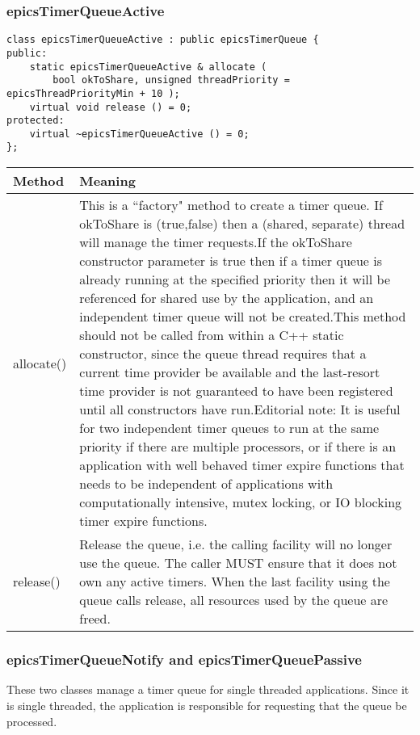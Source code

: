 \subsubsection{epicsTimerQueueActive}

\begin{verbatim}class epicsTimerQueueActive : public epicsTimerQueue {
public:
    static epicsTimerQueueActive & allocate (
        bool okToShare, unsigned threadPriority = epicsThreadPriorityMin + 10 );
    virtual void release () = 0;
protected:
    virtual ~epicsTimerQueueActive () = 0;
};
\end{verbatim}
\begin{center}\begin{longtable}{p{1.1in}p{5.0in}}
\textbf{Method} & \textbf{Meaning}\\
\hline
allocate() & This is a ``factory" method to create a timer queue. If okToShare is (true,false) then a (shared, separate) thread will manage the timer requests.If the okToShare constructor parameter is true then if a timer queue is already running at the specified priority then it will be referenced for shared use by the application, and an independent timer queue will not be created.This method should not be called from within a C++ static constructor, since the queue thread requires that a current time provider be available and the last-resort time provider is not guaranteed to have been registered until all constructors have run.Editorial note: It is useful for two independent timer queues to run at the same priority if there are multiple processors, or if there is an application with well behaved timer expire functions that needs to be independent of applications with computationally intensive, mutex locking, or IO blocking timer expire functions. \\
release() & Release the queue, i.e. the calling facility will no longer use the queue. The caller MUST ensure that it does not own any active timers. When the last facility using the queue calls release, all resources used by the queue are freed.
\end{longtable}\end{center}


\subsubsection{epicsTimerQueueNotify and epicsTimerQueuePassive}

These two classes manage a timer queue for single threaded applications. Since it is single threaded, the application is 
responsible for requesting that the queue be processed.

